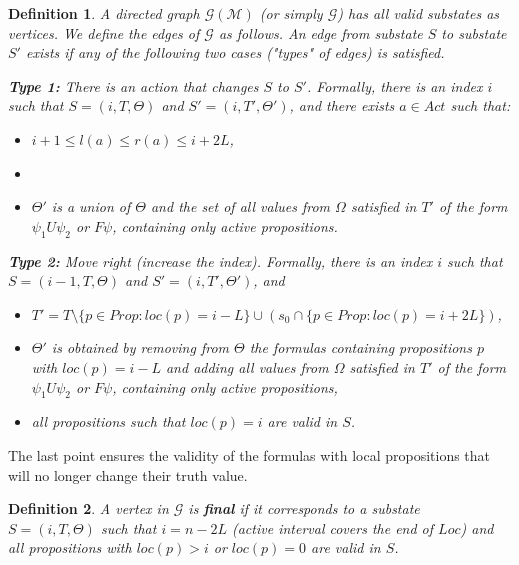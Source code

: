 \documentclass[a4paper,fleqn]{cas-dc}
\newtheorem{Definition}{Definition}
\begin{document}
\begin{Definition}\label{g}
A directed graph $\mathcal{G(M)}$ (or simply $\mathcal{G}$)
has all valid substates as vertices. We define the edges of $\mathcal{G}$ as follows.
An edge from substate $S$ to substate $S'$ exists if any of the following two cases ("types" of edges) is satisfied.

{\bf Type 1:} There is an action that changes $S$ to $S'$. Formally, there is an index $i$ such that $S=(i, T, \Theta)$ and $S'=(i, T', \Theta')$, and there exists $a\in Act$ such that:
\begin{itemize}
    \item $i+1 \le l(a) \le r(a) \le i+2L$,
    \item {}
    \item $\Theta'$ is a union of $\Theta$ and the set of all values from $\Omega$ satisfied in $T'$ of the form $\psi_1 U \psi_2$ or $F\psi$, containing only active propositions.
\end{itemize}

{\bf Type 2:} Move right (increase the index). Formally, there is an index $i$ such that
$S=(i-1, T, \Theta)$ and $S'=(i, T', \Theta')$, and
\begin{itemize}
    \item $T'=T\setminus\{p\in Prop : loc(p)=i-L\}\cup(s_0\cap\{p\in Prop : loc(p)=i+2L\})$,
    \item $\Theta'$ is obtained by removing from $\Theta$ the formulas containing propositions $p$ with
        $loc(p)=i-L$ and adding all values from $\Omega$ satisfied in $T'$ of the form $\psi_1 U \psi_2$ or $F\psi$, containing only active propositions,
    \item all propositions such that $loc(p)=i$ are valid in $S$.
\end{itemize}
\end{Definition}

The last point ensures the validity of the formulas with local propositions that will no longer change their truth value.
 
\begin{Definition}
A vertex in $\mathcal{G}$ is {\bf final} if it corresponds to a substate $S=(i, T, \Theta)$ such that $i=n-2L$
    (active interval covers the end of $Loc$) and all propositions with $loc(p)>i$ or $loc(p)=0$ are valid in $S$.
\end{Definition}
\end{document}
